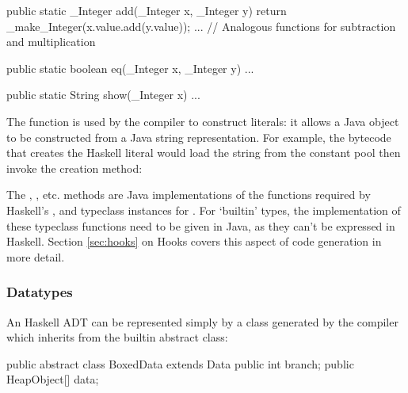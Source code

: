 \documentclass[dissertation.tex]{subfiles}
\begin{document}
{{{\begin{javafigure}
{                public static _Integer add(_Integer x, _Integer y) {
                    return _make_Integer(x.value.add(y.value));
                }
                ... // Analogous functions for subtraction and multiplication

                public static boolean eq(_Integer x, _Integer y) { ... }

                public static String show(_Integer x) { ... }
            }
            \end{javafigure}

            The  function is used by the compiler to construct  literals:
            it allows a Java  object to be constructed from a Java string representation. For example,
            the bytecode that creates the Haskell literal  would load the string  from the
            constant pool then invoke the creation method:


            The , , etc. methods are Java implementations of the functions required by Haskell's
            ,  and  typeclass instances for . For `builtin'
            types, the implementation of these typeclass functions need to be given in Java, as they can't be expressed
            in Haskell. Section \ref{sec:hooks} on Hooks covers this aspect of code generation in more detail.

        }
        \subsubsection{Datatypes}
        {
            
            An Haskell ADT can be represented simply by a class generated by the compiler which inherits from the
             builtin abstract class:

            \begin{javafigure}
            public abstract class BoxedData extends Data {
                public int branch;
                public HeapObject[] data;
            }
            \end{javafigure}

}}}
\end{document}

